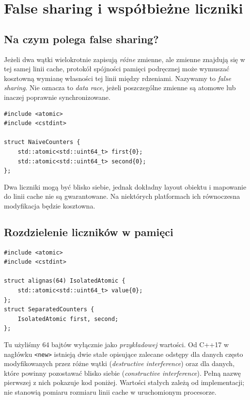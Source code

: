 \section{False sharing i współbieżne liczniki}
\label{sec:cpp10-false-sharing}

\subsection{Na czym polega false sharing?}

Jeżeli dwa wątki wielokrotnie zapisują \emph{różne} zmienne, ale
zmienne znajdują się w tej samej linii cache, protokół spójności
pamięci podręcznej może wymuszać kosztowną wymianę własności tej
linii między rdzeniami. Nazywamy to \emph{false sharing}.
Nie oznacza to \emph{data race}, jeżeli poszczególne zmienne są
atomowe lub inaczej poprawnie synchronizowane.

\begin{lstlisting}
#include <atomic>
#include <cstdint>

struct NaiveCounters {
    std::atomic<std::uint64_t> first{0};
    std::atomic<std::uint64_t> second{0};
};
\end{lstlisting}

Dwa liczniki mogą być blisko siebie, jednak dokładny layout obiektu
i mapowanie do linii cache nie są gwarantowane. Na niektórych
platformach ich równoczesna modyfikacja będzie kosztowna.

\subsection{Rozdzielenie liczników w pamięci}

\begin{lstlisting}
#include <atomic>
#include <cstdint>

struct alignas(64) IsolatedAtomic {
    std::atomic<std::uint64_t> value{0};
};
struct SeparatedCounters {
    IsolatedAtomic first, second;
};
\end{lstlisting}

Tu użyliśmy 64 bajtów wyłącznie jako \emph{przykładowej} wartości.
Od C++17 w nagłówku \texttt{<new>} istnieją dwie stałe
opisujące zalecane odstępy dla danych często modyfikowanych przez
różne wątki (\emph{destructive interference}) oraz dla danych,
które powinny pozostawać blisko siebie (\emph{constructive
interference}). Pełną nazwę pierwszej z nich pokazuje kod poniżej.
Wartości stałych zależą od implementacji; nie stanowią pomiaru
rozmiaru linii cache w uruchomionym procesorze.

